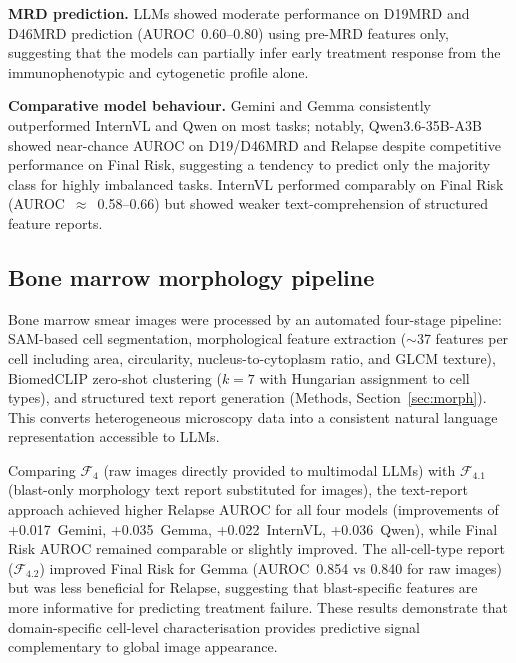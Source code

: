 \documentclass[pdflatex,sn-nature]{sn-jnl}
\begin{document}
\textbf{MRD prediction.}
LLMs showed moderate performance on D19MRD and D46MRD prediction
(AUROC~0.60--0.80) using pre-MRD features only, suggesting that the
models can partially infer early treatment response from the
immunophenotypic and cytogenetic profile alone.

\textbf{Comparative model behaviour.}
Gemini and Gemma consistently outperformed InternVL and Qwen on most
tasks; notably, Qwen3.6-35B-A3B showed near-chance AUROC on D19/D46MRD
and Relapse despite competitive performance on Final Risk, suggesting
a tendency to predict only the majority class for highly imbalanced
tasks.
InternVL performed comparably on Final Risk (AUROC~$\approx$~0.58--0.66)
but showed weaker text-comprehension of structured feature reports.

\subsection{Bone marrow morphology pipeline}
\label{sec:morph_results}

Bone marrow smear images were processed by an automated four-stage
pipeline: SAM-based cell segmentation, morphological feature extraction
($\sim$37 features per cell including area, circularity,
nucleus-to-cytoplasm ratio, and GLCM texture), BiomedCLIP zero-shot
clustering ($k=7$ with Hungarian assignment to cell types), and
structured text report generation (Methods, Section~\ref{sec:morph}).
This converts heterogeneous microscopy data into a consistent natural
language representation accessible to LLMs.

Comparing $\mathcal{F}_{4}$ (raw images directly provided to
multimodal LLMs) with $\mathcal{F}_{4.1}$ (blast-only morphology text
report substituted for images), the text-report approach achieved
higher Relapse AUROC for all four models (improvements of
+0.017~Gemini, +0.035~Gemma, +0.022~InternVL, +0.036~Qwen), while
Final Risk AUROC remained comparable or slightly improved.
The all-cell-type report ($\mathcal{F}_{4.2}$) improved Final Risk for
Gemma (AUROC~0.854 vs 0.840 for raw images) but was less beneficial
for Relapse, suggesting that blast-specific features are more
informative for predicting treatment failure.
These results demonstrate that domain-specific cell-level
characterisation provides predictive signal complementary to global
image appearance.

\end{document}
